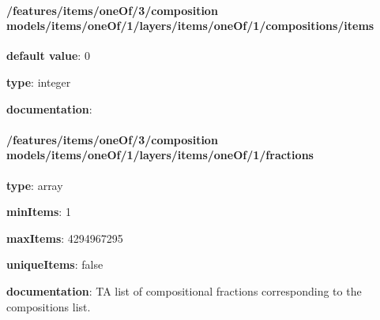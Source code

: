 \begin{itemized}
\paragraph{/features/items/oneOf/3/composition models/items/oneOf/1/layers/items/oneOf/1/compositions/items} \begin{itemized}
\item {\bf default value}: 0
\item {\bf type}: integer
\item {\bf documentation}: 
\end{itemized}\end{itemized}\paragraph{/features/items/oneOf/3/composition models/items/oneOf/1/layers/items/oneOf/1/fractions} \begin{itemized}
\item {\bf type}: array
\item {\bf minItems}: 1
\item {\bf maxItems}: 4294967295
\item {\bf uniqueItems}: false
\item {\bf documentation}: TA list of compositional fractions corresponding to the compositions list.

\end{itemized}
